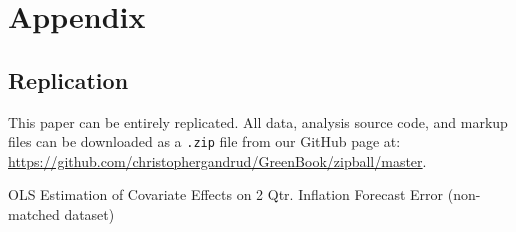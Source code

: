 \documentclass[a4paper]{article}\usepackage{graphicx, color}
\begin{document}
\clearpage
\section*{Appendix}

\subsection*{Replication}

This paper can be entirely replicated. All data, analysis source code, and markup files can be downloaded as a {\tt{.zip}} file from our GitHub page at: {\url{https://github.com/christophergandrud/GreenBook/zipball/master}}.


\begin{table}[ht]
    \caption{OLS Estimation of Covariate Effects on 2 Qtr. Inflation Forecast Error (non-matched dataset)}
    \label{OutputNL}
    \vspace{0.25cm}
    \begin{center}
    {\footnotesize

}
\end{center}
\end{table}
\end{document}
